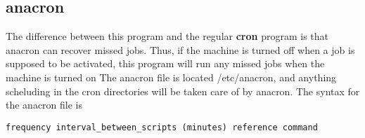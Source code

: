 \documentclass{report}
\begin{document}
    \bigbreak \noindent 
    \subsection{anacron}
    \bigbreak \noindent 
    The difference between this program and the regular \textbf{cron} program is that anacron can recover missed jobs. Thus, if the machine is turned off when a job is supposed to be activated, this program will run any missed jobs when the machine is turned on 
    \bigbreak \noindent 
    The anacron file is located /etc/anacron, and anything scheluding in the cron directories will be taken care of by anacron. The syntax for the anacron file is 
    \bigbreak \noindent
\begin{verbatim}
frequency interval_between_scripts (minutes) reference command
\end{verbatim}
\bigbreak \noindent
    
    \pagebreak \bigbreak \noindent 
\end{document}
